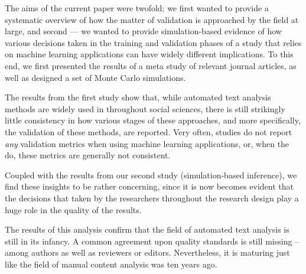 \documentclass[man, 12pt, a4paper, nolmodern, noextraspace]{apa6}
\begin{document}
    The aims of the current paper were twofold; we first wanted to provide a systematic overview of how the matter of validation is approached by the field at large, and second --- we wanted to provide simulation-based evidence of how various decisions taken in the training and validation phases of a study that relies on machine learning applications can have widely different implications. To this end, we first presented the results of a meta study of relevant journal articles, as well as designed a set of Monte Carlo simulations.
    
    The results from the first study show that, while automated text analysis methods are widely used in throughout social sciences, there is still strikingly little consistency in how various stages of these approaches, and more specifically, the validation of these methods, are reported. Very often, studies do not report \textit{any} validation metrics when using machine learning applications, or, when the do, these metrics are generally not consistent. 
    
    
    Coupled with the results from our second study (simulation-based inference), we find these insights to be rather concerning, since it is now becomes evident that the decisions that taken by the researchers throughout the research design play a huge role in the quality of the results.
    
    The results of this analysis confirm that the field of automated text analysis is still in its infancy. A common agreement upon quality standards is still missing – among authors as well as reviewers or editors. Nevertheless, it is maturing just like the field of manual content analysis was ten years ago.
    
    
    
    
    
    
	
\end{document}
